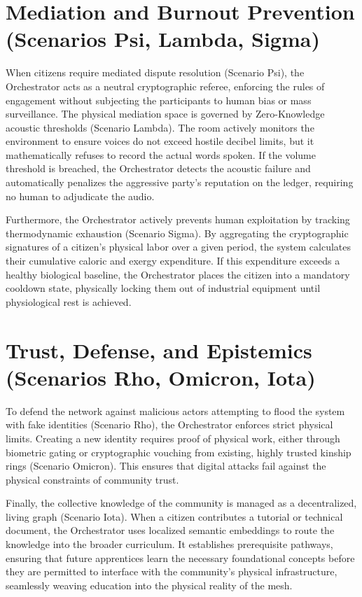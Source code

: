 \section{Mediation and Burnout Prevention (Scenarios Psi, Lambda, Sigma)}
When citizens require mediated dispute resolution (Scenario Psi), the Orchestrator acts as a neutral cryptographic referee, enforcing the rules of engagement without subjecting the participants to human bias or mass surveillance. The physical mediation space is governed by Zero-Knowledge acoustic thresholds (Scenario Lambda). The room actively monitors the environment to ensure voices do not exceed hostile decibel limits, but it mathematically refuses to record the actual words spoken. If the volume threshold is breached, the Orchestrator detects the acoustic failure and automatically penalizes the aggressive party's reputation on the ledger, requiring no human to adjudicate the audio.

Furthermore, the Orchestrator actively prevents human exploitation by tracking thermodynamic exhaustion (Scenario Sigma). By aggregating the cryptographic signatures of a citizen's physical labor over a given period, the system calculates their cumulative caloric and exergy expenditure. If this expenditure exceeds a healthy biological baseline, the Orchestrator places the citizen into a mandatory cooldown state, physically locking them out of industrial equipment until physiological rest is achieved.

\section{Trust, Defense, and Epistemics (Scenarios Rho, Omicron, Iota)}
To defend the network against malicious actors attempting to flood the system with fake identities (Scenario Rho), the Orchestrator enforces strict physical limits. Creating a new identity requires proof of physical work, either through biometric gating or cryptographic vouching from existing, highly trusted kinship rings (Scenario Omicron). This ensures that digital attacks fail against the physical constraints of community trust.

Finally, the collective knowledge of the community is managed as a decentralized, living graph (Scenario Iota). When a citizen contributes a tutorial or technical document, the Orchestrator uses localized semantic embeddings to route the knowledge into the broader curriculum. It establishes prerequisite pathways, ensuring that future apprentices learn the necessary foundational concepts before they are permitted to interface with the community's physical infrastructure, seamlessly weaving education into the physical reality of the mesh.
